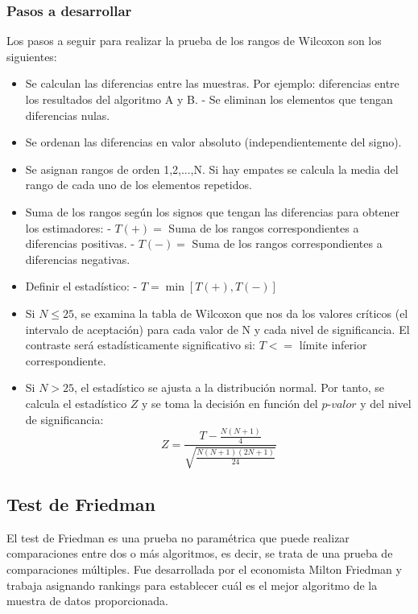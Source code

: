 \subsubsection{Pasos a desarrollar}
Los pasos a seguir para realizar la prueba de los rangos de Wilcoxon son los siguientes:
\begin{itemize}
\item Se calculan las diferencias entre las muestras. Por ejemplo: diferencias entre los resultados del algoritmo
A y B.
\subitem - Se eliminan los elementos que tengan diferencias nulas.
\item Se ordenan las diferencias en valor absoluto (independientemente del signo).
\item Se asignan rangos de orden 1,2,...,N. Si hay empates se calcula la media del rango de cada uno de los elementos
repetidos.
\item Suma de los rangos según los signos que tengan las diferencias para obtener los estimadores:
\subitem - $T(+) = $ Suma de los rangos correspondientes a diferencias positivas. 
\subitem - $T(-) = $ Suma de los rangos correspondientes a diferencias negativas.
\item Definir el estadístico:
\subitem - $T = \min [T(+), T(-)]$
\item Si $N \leq 25$, se examina la tabla de Wilcoxon que nos da los valores críticos (el intervalo de aceptación)
para cada valor de N y cada nivel de significancia. El contraste será estadísticamente significativo si: 
$T <= $ límite inferior correspondiente.
\item Si $N > 25$, el estadístico se ajusta a la distribución normal. Por tanto, se calcula el estadístico $Z$ y
se toma la decisión en función del $\textit{p-valor}$ y del nivel de significancia:
\[ Z = \frac{T-\frac{N(N+1)}{4}}{\sqrt{\frac{N(N+1)(2N+1)}{24}}} \]
\end{itemize}


\subsection{Test de Friedman}
El test de Friedman es una prueba no paramétrica que puede realizar comparaciones entre dos o más algoritmos, es
decir, se trata de una prueba de comparaciones múltiples. Fue desarrollada por el economista Milton Friedman y
trabaja asignando rankings para establecer cuál es el mejor algoritmo de la muestra de datos proporcionada.

